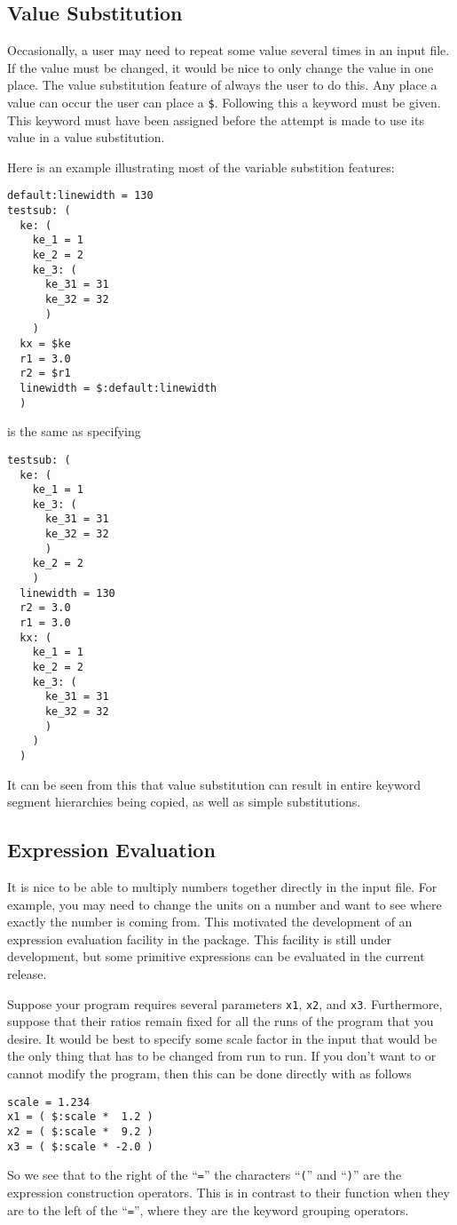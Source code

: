 \subsection{Value Substitution}
\label{ParsedKeyValvalsub}

Occasionally, a user may need to repeat some value several times in an
input file.  If the value must be changed, it would be nice to only
change the value in one place.  The value substitution feature of
 always the user to do this.  Any place a value can
occur the user can place a \verb|$|.  Following this a keyword must be
given.  This keyword must have been assigned before the attempt is made
to use its value in a value substitution.

Here is an example illustrating most of the variable substition
features:
\begin{verbatim}
default:linewidth = 130
testsub: (
  ke: (
    ke_1 = 1
    ke_2 = 2
    ke_3: (
      ke_31 = 31
      ke_32 = 32
      )
    )
  kx = $ke
  r1 = 3.0
  r2 = $r1
  linewidth = $:default:linewidth
  )
\end{verbatim}
is the same as specifying
\begin{verbatim}
testsub: (
  ke: (
    ke_1 = 1
    ke_3: (
      ke_31 = 31
      ke_32 = 32
      )
    ke_2 = 2
    )
  linewidth = 130
  r2 = 3.0
  r1 = 3.0
  kx: (
    ke_1 = 1
    ke_2 = 2
    ke_3: (
      ke_31 = 31
      ke_32 = 32
      )
    )
  )
\end{verbatim}
It can be seen from this that value substitution can result in entire
keyword segment hierarchies being copied, as well as simple
substitutions.


\subsection{Expression Evaluation}

It is nice to be able to multiply numbers together directly in the input
file.  For example, you may need to change the units on a number and
want to see where exactly the number is coming from.  This motivated the
development of an expression evaluation facility in the
 package.  This facility is still under development,
but some primitive expressions can be evaluated in the current release.

Suppose your program requires several parameters \verb|x1|, \verb|x2|,
and \verb|x3|.  Furthermore, suppose that their ratios remain fixed for
all the runs of the program that you desire.  It would be best to
specify some scale factor in the input that would be the only thing that
has to be changed from run to run.  If you don't want to or cannot
modify the program, then this can be done directly with
 as follows
\begin{verbatim}
scale = 1.234
x1 = ( $:scale *  1.2 )
x2 = ( $:scale *  9.2 )
x3 = ( $:scale * -2.0 )
\end{verbatim}
So we see that to the right of the ``\verb|=|'' the characters
``\verb|(|'' and ``\verb|)|'' are the expression construction operators.
This is in contrast to their function when they are to the left of the
``\verb|=|'', where they are the keyword grouping operators.


